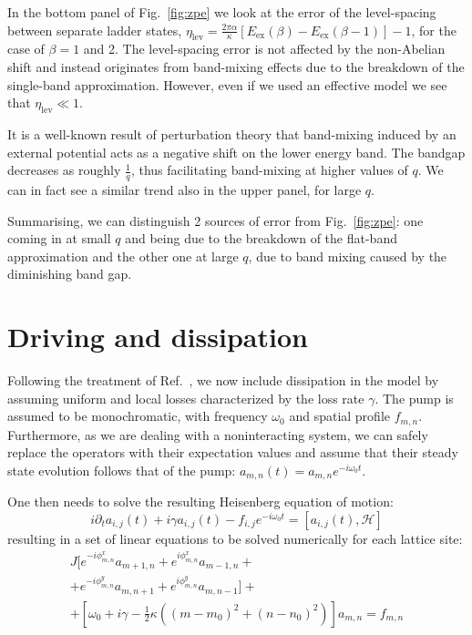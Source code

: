 \documentclass[twocolumn, 10pt, aps, superscriptaddress, floatfix, showpacs, pra, citeautoscript]{revtex4-1}
\begin{document}
In the bottom panel of Fig.~\ref{fig:zpe} we look at the error of the
level-spacing between separate ladder states,
$\eta_{\text{lev}} = \frac{2\pi \alpha}{\kappa} [E_{\text{ex}}(\beta)
- E_{\text{ex}}(\beta - 1)] -1$,
for the case of $\beta = 1$ and 2.  The level-spacing error is not
affected by the non-Abelian shift and instead originates from
band-mixing effects due to the breakdown of the single-band
approximation. However, even if we used an effective model we see that
$\eta_{\text{lev}} \ll 1$.

It is a well-known result of perturbation theory that band-mixing
induced by an external potential acts as a negative shift on the lower
energy band.  The bandgap decreases as roughly $\frac{1}{q}$, thus
facilitating band-mixing at higher values of $q$. We can in fact see a
similar trend also in the upper panel, for large $q$.

Summarising, we can distinguish 2 sources of error from
Fig.~\ref{fig:zpe}: one coming in at small $q$ and being due to the
breakdown of the flat-band approximation and the other one at large
$q$, due to band mixing caused by the diminishing band gap.




\section{Driving and dissipation}\label{sec:driven-dissipation}

Following the treatment of Ref.~, we now
include dissipation in the model by assuming uniform and local losses
characterized by the loss rate $\gamma$. The pump is assumed to be
monochromatic, with frequency $\omega_0$ and spatial profile
$f_{m,n}$.  Furthermore, as we are dealing with a noninteracting
system, we can safely replace the operators with their expectation
values and assume that their steady state evolution follows that of
the pump: $a_{m,n}(t) = a_{m,n} e^{-i \omega_0 t}$.

One then needs to solve the resulting Heisenberg equation of motion:
%
\begin{equation}
i\partial_{t}a_{i,j}(t)+i\gamma
a_{i,j}(t)-f_{i,j}e^{-i\omega_{0}t}=\left[a_{i,j}(t),\mathcal{H}\right]
\end{equation}
resulting in a set of linear equations to be solved numerically for each
lattice site:
%
\begin{multline}\label{eq:linear_problem}
J[e^{-i\phi_{m,n}^x}a_{m+1,n}+e^{i\phi_{m,n}^x}a_{m-1,n}+\\
+e^{-i\phi_{m,n}^y}a_{m,n+1}+e^{i\phi_{m,n}^y}a_{m,n-1}]+\\
+\left[\omega_{0}+i\gamma-\frac{1}{2}\kappa
\left((m-m_0)^{2}+(n-n_0)^{2}\right)\right]a_{m,n}=f_{m,n}
\end{multline}
\end{document}
